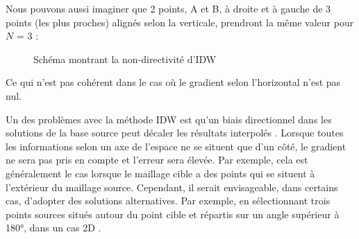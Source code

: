 Nous pouvons aussi imaginer que 2 points, A et B, à droite et à gauche de 3 points (les plus proches) alignés selon la verticale, prendront la même valeur pour \( N \) = 3 :

\begin{figure}[H]
    \centering
    
    \caption{Schéma montrant la non-directivité d'IDW}
\end{figure}

    
Ce qui n'est pas cohérent dans le cas où le gradient selon l'horizontal n'est pas nul.

Un des problèmes avec la méthode IDW est qu'un biais directionnel dans les solutions de la base source peut décaler les résultats interpolés \cite{palmer2009, idw-mapscaping}.
Lorsque toutes les informations selon un axe de l'espace ne se situent que d'un côté, le gradient ne sera pas pris en compte et l'erreur sera élevée. Par exemple, cela est généralement le cas lorsque le maillage cible a des points qui se situent à l’extérieur du maillage source.
Cependant, il serait envisageable, dans certains cas, d'adopter des solutions alternatives. Par exemple, en sélectionnant trois points sources situés autour du point cible et répartis sur un angle supérieur à 180°, dans un cas 2D \cite{idw-update}.  %

